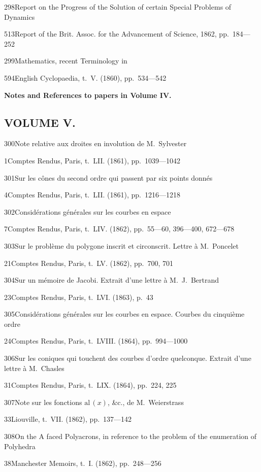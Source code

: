 \documentclass[11pt,a4paper]{book}
\providecommand{\tocentry}[2]{#1\dotfill #2\par}
\begin{document}
\tocentry{298}{Report on the Progress of the Solution of certain Special Problems of Dynamics}{513}{Report of the Brit. Assoc. for the Advancement of Science, 1862, pp.~184---252}

\tocentry{299}{Mathematics, recent Terminology in}{594}{English Cyclopaedia, t.~V. (1860), pp.~534---542}

\vspace{1cm}
\noindent\textbf{Notes and References to papers in Volume IV.} 

\newpage

\subsection*{VOLUME V.}

\tocentry{300}{Note relative aux droites en involution de M.~Sylvester}{1}{Comptes Rendus, Paris, t.~LII. (1861), pp.~1039---1042}

\tocentry{301}{Sur les c\^{o}nes du second ordre qui passent par six points donn\'{e}s}{4}{Comptes Rendus, Paris, t.~LII. (1861), pp.~1216---1218}

\tocentry{302}{Consid\'{e}rations g\'{e}n\'{e}rales sur les courbes en espace}{7}{Comptes Rendus, Paris, t.~LIV. (1862), pp.~55---60, 396---400, 672---678}

\tocentry{303}{Sur le probl\`{e}me du polygone inscrit et circonscrit. Lettre \`{a} M.~Poncelet}{21}{Comptes Rendus, Paris, t.~LV. (1862), pp.~700, 701}

\tocentry{304}{Sur un m\'{e}moire de Jacobi. Extrait d'une lettre \`{a} M.~J.~Bertrand}{23}{Comptes Rendus, Paris, t.~LVI. (1863), p.~43}

\tocentry{305}{Consid\'{e}rations g\'{e}n\'{e}rales sur les courbes en espace. Courbes du cinqui\`{e}me ordre}{24}{Comptes Rendus, Paris, t.~LVIII. (1864), pp.~994---1000}

\tocentry{306}{Sur les coniques qui touchent des courbes d'ordre quelconque. Extrait d'une lettre \`{a} M.~Chasles}{31}{Comptes Rendus, Paris, t.~LIX. (1864), pp.~224, 225}

\tocentry{307}{Note sur les fonctions $\mathrm{al\,}(x)$, \&c., de M.~Weierstrass}{33}{Liouville, t.~VII. (1862), pp.~137---142}

\tocentry{308}{On the A faced Polyacrons, in reference to the problem of the enumeration of Polyhedra}{38}{Manchester Memoirs, t.~I. (1862), pp.~248---256}
\end{document}
